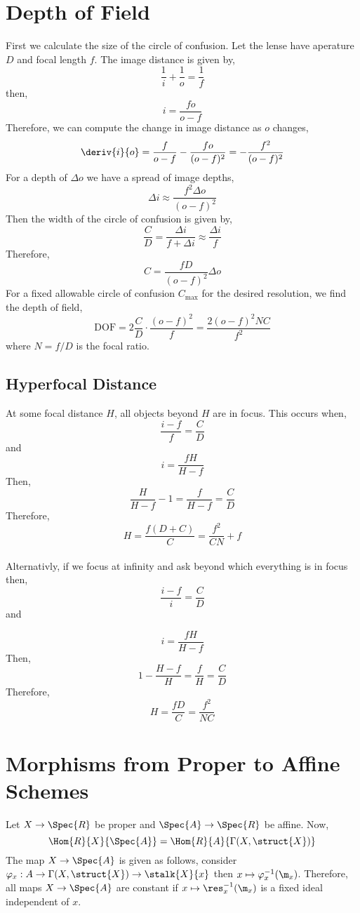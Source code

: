 \documentclass[12pt]{article}
\begin{document}
\section{Depth of Field}

First we calculate the size of the circle of confusion. Let the lense have aperature $D$ and focal length $f$. The image distance is given by,
\[ \frac{1}{i} + \frac{1}{o} = \frac{1}{f} \]
then,
\[ i = \frac{f o}{o - f} \]
Therefore, we can compute the change in image distance as $o$ changes,
\[ \deriv{i}{o} = \frac{f}{o - f} - \frac{f o}{(o - f)^2} = - \frac{f^2}{(o - f)^2} \]
For a depth of $\Delta o$ we have a spread of image depths,
\[ \Delta i  \approx \frac{f^2 \Delta o}{(o - f)^2} \]
Then the width of the circle of confusion is given by,
\[ \frac{C}{D} = \frac{\Delta i}{f + \Delta i} \approx \frac{\Delta i}{f} \]
Therefore,
\[ C = \frac{f D}{(o - f)^2} \Delta o \]
For a fixed allowable circle of confusion $C_{\text{max}}$ for the desired resolution, we find the depth of field,
\[ \text{DOF} = 2 \frac{C}{D} \cdot \frac{(o - f)^2}{f} = \frac{2 (o - f)^2 N C}{f^2} \]
where $N = f / D$ is the focal ratio. 

\subsection{Hyperfocal Distance}

At some focal distance $H$, all objects beyond $H$ are in focus. This occurs when,
\[ \frac{i - f}{f} = \frac{C}{D} \]
and
\[ i = \frac{f H}{H - f} \]
Then,
\[ \frac{H}{H - f} - 1 = \frac{f}{H - f} = \frac{C}{D} \]
Therefore,
\[ H = \frac{f (D + C)}{C} = \frac{f^2}{CN} + f \]
\bigskip\\
Alternativly,
if we focus at infinity and ask beyond which everything is in focus then,
\[ \frac{i - f}{i} = \frac{C}{D} \]
and

\[ i = \frac{f H}{H - f} \]
Then,
\[ 1 - \frac{H - f}{H} = \frac{f}{H} = \frac{C}{D} \]
Therefore,
\[ H = \frac{f D}{C} = \frac{f^2}{NC} \]

\section{Morphisms from Proper to Affine Schemes}

Let $X \to \Spec{R}$ be proper and $\Spec{A} \to \Spec{R}$ be affine. Now,
\[ \Hom{R}{X}{\Spec{A}} = \Hom{R}{A}{\Gamma(X, \struct{X})} \]
The map $X \to \Spec{A}$ is given as follows, consider $\varphi_x : A \to \Gamma(X, \struct{X}) \to \stalk{X}{x}$ then $x \mapsto \varphi_x^{-1}(\m_x)$. Therefore, all maps $X \to \Spec{A}$ are constant if $x \mapsto \res_x^{-1}(\m_x)$ is a fixed ideal independent of $x$.  
\end{document}
